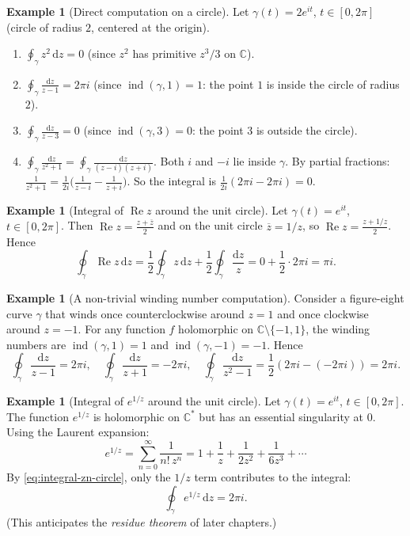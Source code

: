 \documentclass[12pt,a4paper,openany]{book}
\theoremstyle{definition}
\newtheorem{example}[definition]{Example}
\theoremstyle{plain}
\theoremstyle{remark}
\newcommand{\C}{\mathbb{C}}
\DeclareMathOperator{\re}{Re}
\DeclareMathOperator{\ind}{ind}
\newcommand{\dd}{\mathrm{d}}
\newcommand{\conj}[1]{\overline{#1}}
\begin{document}
\begin{example}[Direct computation on a circle]\label{ex:circle-computations}
Let $\gamma(t) = 2e^{it}$, $t\in[0,2\pi]$ (circle of radius $2$, centered
at the origin).
\begin{enumerate}[label=\textup{(\alph*)}]
  \item $\displaystyle\oint_\gamma z^2\,\dd z = 0$
    (since $z^2$ has primitive $z^3/3$ on $\C$).
  \item $\displaystyle\oint_\gamma\frac{\dd z}{z-1} = 2\pi i$
    (since $\ind(\gamma,1)=1$: the point $1$ is inside the circle of radius $2$).
  \item $\displaystyle\oint_\gamma\frac{\dd z}{z-3} = 0$
    (since $\ind(\gamma,3)=0$: the point $3$ is outside the circle).
  \item $\displaystyle\oint_\gamma\frac{\dd z}{z^2+1}
    = \oint_\gamma\frac{\dd z}{(z-i)(z+i)}$.
    Both $i$ and $-i$ lie inside $\gamma$.  By partial fractions:
    $\frac{1}{z^2+1} = \frac{1}{2i}\bigl(\frac{1}{z-i}-\frac{1}{z+i}\bigr)$.
    So the integral is $\frac{1}{2i}(2\pi i - 2\pi i) = 0$.
\end{enumerate}
\end{example}

\begin{example}[Integral of $\re z$ around the unit circle]\label{ex:re-z-integral}
Let $\gamma(t)=e^{it}$, $t\in[0,2\pi]$.  Then $\re z = \frac{z+\conj{z}}{2}$
and on the unit circle $\conj{z} = 1/z$, so $\re z = \frac{z+1/z}{2}$.
Hence
\[
  \oint_\gamma\re z\,\dd z
  = \frac{1}{2}\oint_\gamma z\,\dd z + \frac{1}{2}\oint_\gamma\frac{\dd z}{z}
  = 0 + \frac{1}{2}\cdot 2\pi i = \pi i.
\]
\end{example}

\begin{example}[A non-trivial winding number computation]\label{ex:winding-figure-eight}
Consider a figure-eight curve $\gamma$ that winds once counterclockwise
around $z=1$ and once clockwise around $z=-1$.  For any function $f$
holomorphic on $\C\setminus\{-1,1\}$, the winding numbers are
$\ind(\gamma,1) = 1$ and $\ind(\gamma,-1)=-1$.  Hence
\[
  \oint_\gamma\frac{\dd z}{z-1} = 2\pi i, \quad
  \oint_\gamma\frac{\dd z}{z+1} = -2\pi i, \quad
  \oint_\gamma\frac{\dd z}{z^2-1} = \frac{1}{2}(2\pi i - (-2\pi i)) = 2\pi i.
\]
\end{example}

\begin{example}[Integral of $e^{1/z}$ around the unit circle]\label{ex:exp-1-over-z}
Let $\gamma(t) = e^{it}$, $t\in[0,2\pi]$.  The function $e^{1/z}$ is
holomorphic on $\C^*$ but has an essential singularity at $0$.  Using the
Laurent expansion:
\[
  e^{1/z} = \sum_{n=0}^{\infty}\frac{1}{n!\,z^n}
  = 1 + \frac{1}{z} + \frac{1}{2z^2} + \frac{1}{6z^3} + \cdots
\]
By \eqref{eq:integral-zn-circle}, only the $1/z$ term contributes to
the integral:
\[
  \oint_\gamma e^{1/z}\,\dd z = 2\pi i.
\]
(This anticipates the \emph{residue theorem} of later chapters.)
\end{example}
\end{document}
